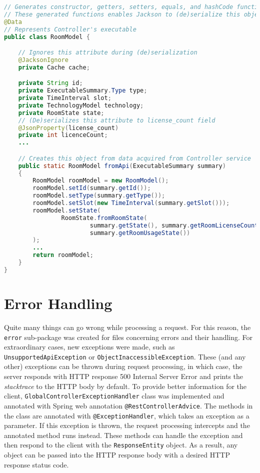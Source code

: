 \begin{lstlisting}[language=java, caption=RoomModel.java, label=lst:model]
// Generates constructor, getters, setters, equals, and hashCode functions
// These generated functions enables Jackson to (de)serialize this object
@Data
// Represents Controller's executable
public class RoomModel {

    // Ignores this attribute during (de)serialization
    @JacksonIgnore
    private Cache cache;

    private String id;
    private ExecutableSummary.Type type;
    private TimeInterval slot;
    private TechnologyModel technology;
    private RoomState state;
    // (De)serializes this attribute to license_count field
    @JsonProperty(license_count)
    private int licenceCount;
    ...

    // Creates this object from data acquired from Controller service
    public static RoomModel fromApi(ExecutableSummary summary)
    {
        RoomModel roomModel = new RoomModel();
        roomModel.setId(summary.getId());
        roomModel.setType(summary.getType());
        roomModel.setSlot(new TimeInterval(summary.getSlot()));
        roomModel.setState(
                RoomState.fromRoomState(
                        summary.getState(), summary.getRoomLicenseCount(),
                        summary.getRoomUsageState())
        );
        ...
        return roomModel;
    }
}
\end{lstlisting}


\section{Error Handling}
Quite many things can go wrong while processing a request. For this reason, the \texttt{error} sub-package was created for files concerning errors and their handling.
For extraordinary cases, new exceptions were made, such as \texttt{UnsupportedApiException} or \texttt{ObjectInaccessibleException}.
These (and any other) exceptions can be thrown during request processing, in which case, the server responds with HTTP response 500 Internal Server Error and prints the \emph{stacktrace} to the HTTP body by default.
To provide better information for the client, \texttt{GlobalController\-ExceptionHandler} class was implemented and annotated with Spring web annotation \texttt{@RestControllerAdvice}.
The methods in the class are annotated with \texttt{@ExceptionHandler}, which takes an exception as a parameter. If this exception is thrown, the request processing intercepts and the annotated method runs instead.
These methods can handle the exception and then respond to the client with the \texttt{ResponseEntity} object. As a result, any object can be passed into the HTTP response body with a desired HTTP response status code.

